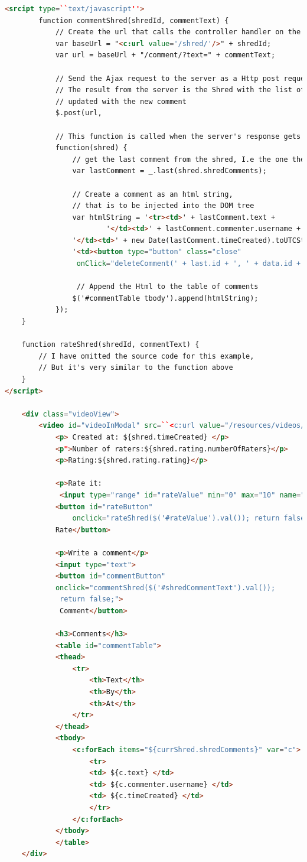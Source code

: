 \begin{lstlisting}[language=html]
	<srcipt type=``text/javascript''>
		function commentShred(shredId, commentText) {
			// Create the url that calls the controller handler on the server
			var baseUrl = "<c:url value='/shred/'/>" + shredId;
			var url = baseUrl + "/comment/?text=" + commentText;
	
			// Send the Ajax request to the server as a Http post request.
			// The result from the server is the Shred with the list of comments 
			// updated with the new comment 
			$.post(url,
			
			// This function is called when the server's response gets back
			function(shred) {				
				// get the last comment from the shred, I.e the one the User just created
				var lastComment = _.last(shred.shredComments); 
				
				// Create a comment as an html string,
				// that is to be injected into the DOM tree
				var htmlString = '<tr><td>' + lastComment.text + 
       			        '</td><td>' + lastComment.commenter.username + 
				'</td><td>' + new Date(lastComment.timeCreated).toUTCString() + '</td>'+
				'<td><button type="button" class="close"
				 onClick="deleteComment(' + last.id + ', ' + data.id + ');" >x</button></td></tr>'
				 
				 // Append the Html to the table of comments
				$('#commentTable tbody').append(htmlString);
			});
	}
	
	function rateShred(shredId, commentText) {
		// I have omitted the source code for this example,
		// But it's very similar to the function above
	}
</script>

	<div class="videoView">
		<video id="videoInModal" src=``<c:url value="/resources/videos/"/>''$										{shred.videoPath''</video>
			<p> Created at: ${shred.timeCreated} </p>
			<p">Number of raters:${shred.rating.numberOfRaters}</p>
			<p>Rating:${shred.rating.rating}</p>
			
			<p>Rate it:
			 <input type="range" id="rateValue" min="0" max="10" name="rating" value="5">
			<button id="rateButton"
				onclick="rateShred($('#rateValue').val()); return false;">
			Rate</button>
			
			<p>Write a comment</p>
			<input type="text">
			<button id="commentButton"
			onclick="commentShred($('#shredCommentText').val());
			 return false;">
			 Comment</button>
			
			<h3>Comments</h3>
			<table id="commentTable">
			<thead>
				<tr>
					<th>Text</th>
					<th>By</th>
					<th>At</th>
				</tr>
			</thead>
			<tbody>
				<c:forEach items="${currShred.shredComments}" var="c">
					<tr>
					<td> ${c.text} </td>
					<td> ${c.commenter.username} </td>
					<td> ${c.timeCreated} </td>
					</tr>
				</c:forEach>
			</tbody>
			</table>
	</div>
\end{lstlisting}

